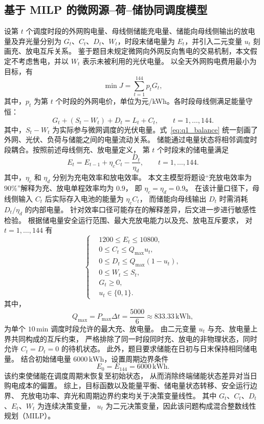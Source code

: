 \documentclass[zihao=-4,a4paper,UTF8,fontset=none]{ctexart}
\begin{document}
\subsection{基于 MILP 的微网源--荷--储协同调度模型} 设第 $t$ 个调度时段的外网购电量、母线侧储能充电量、储能向母线侧输出的放电量及弃光量分别为 $G_t$、$C_t$、$D_t$、$W_t$，时段末储电量为 $E_t$，并引入二元变量 $u_t$ 刻画充、放电互斥关系。 鉴于题目未规定微网向外网反向售电的交易机制，本文假定不考虑售电，并以 $W_t$ 表示未被利用的光伏电量。 以全天外网购电费用最小为目标，有 \begin{equation} \min J=\sum_{t=1}^{144} p_tG_t , \label{eq:q1_objective} \end{equation} 其中，$p_t$ 为第 $t$ 个时段的外网电价，单位为元/kWh。各时段母线侧满足能量守恒： \begin{equation} G_t+(S_t-W_t)+D_t=L_t+C_t, \qquad t=1,\ldots,144 . \label{eq:q1_balance} \end{equation} 其中，$S_t-W_t$ 为实际参与微网调度的光伏电量。式~\eqref{eq:q1_balance} 统一刻画了外网、光伏、负荷与储能之间的电量流动关系。 储能通过电量状态将相邻调度时段耦合。按照前述母线侧充、放电量定义， 第 $t$ 个时段末的储电量满足 \begin{equation} E_t = E_{t-1} +\eta_c C_t -\frac{D_t}{\eta_d}, \qquad t=1,\ldots,144 . \label{eq:q1_storage} \end{equation} 其中，$\eta_c$ 和 $\eta_d$ 分别为充电效率和放电效率。 本文主模型将题设“充放电效率为 $90\%$”解释为充、放电单程效率均为 $0.9$， 即 $\eta_c=\eta_d=0.9$。 在该计量口径下，母线侧输入 $C_t$ 后实际存入电池的能量为 $\eta_c C_t$， 而储能向母线输出 $D_t$ 时需消耗 $D_t/\eta_d$ 的内部电量。 针对效率口径可能存在的解释差异，后文进一步进行敏感性检验。 根据储电量安全运行范围、最大充放电能力以及充、放电互斥要求， 对 $t=1,\ldots,144$ 有 \begin{equation} \left\{ \begin{aligned} &1200\le E_t\le10800,\\ &0\le C_t\le Q_{\max}u_t,\\ &0\le D_t\le Q_{\max}(1-u_t),\\ &0\le W_t\le S_t,\\ &G_t\ge0,\\ &u_t\in\{0,1\}. \end{aligned} \right. \label{eq:q1_constraints} \end{equation} 其中， \[ Q_{\max} = P_{\max}\Delta t = \frac{5000}{6} \approx 833.33\,\mathrm{kWh}, \] 为单个 $10\,\mathrm{min}$ 调度时段允许的最大充、放电量。 由二元变量 $u_t$ 与充、放电量上界共同构成的互斥约束， 严格排除了同一时段同时充、放电的非物理状态，同时允许 $C_t=D_t=0$ 的待机状态。 此外，题目要求储能在日初与日末保持相同储电量。 结合初始储电量 $6000\,\mathrm{kWh}$，设置周期边界条件 \begin{equation} E_0=E_{144}=6000\,\mathrm{kWh}. \label{eq:q1_boundary} \end{equation} 该约束使储能在调度周期末恢复至初始状态， 从而消除终端储能状态差异对当日购电成本的偏置。 综上，目标函数以及能量平衡、储电量状态转移、安全运行边界、 充放电功率、弃光和周期边界约束均关于决策变量线性。 其中 $G_t$、$C_t$、$D_t$、$E_t$、$W_t$ 为连续决策变量， $u_t$ 为二元决策变量，因此该问题构成混合整数线性规划（MILP）。
\end{document}
